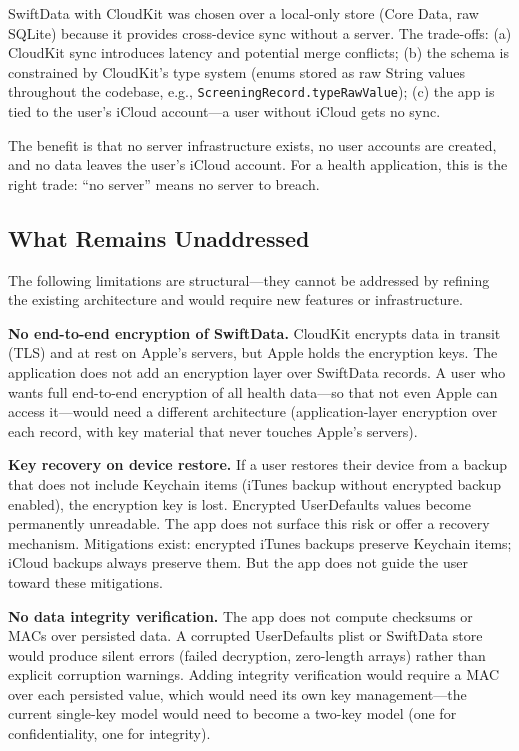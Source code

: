 \documentclass[11pt,a4paper]{article}
\newcommand{\code}[1]{\texttt{\small #1}}
\begin{document}
SwiftData with CloudKit was chosen over a local-only store (Core Data,
raw SQLite) because it provides cross-device sync without a server. The
trade-offs: (a) CloudKit sync introduces latency and potential merge
conflicts; (b) the schema is constrained by CloudKit's type system (enums
stored as raw String values throughout the codebase, e.g.,
\code{ScreeningRecord.typeRawValue}); (c) the app is tied to the user's
iCloud account---a user without iCloud gets no sync.

The benefit is that no server infrastructure exists, no user accounts are
created, and no data leaves the user's iCloud account. For a health
application, this is the right trade: ``no server'' means no server to
breach.

\subsection{What Remains Unaddressed}
\label{sec:unaddressed}

The following limitations are structural---they cannot be addressed by
refining the existing architecture and would require new features or
infrastructure.

\textbf{No end-to-end encryption of SwiftData.} CloudKit encrypts data in
transit (TLS) and at rest on Apple's servers, but Apple holds the encryption
keys. The application does not add an encryption layer over SwiftData
records. A user who wants full end-to-end encryption of all health data---so
that not even Apple can access it---would need a different architecture
(application-layer encryption over each record, with key material that never
touches Apple's servers).

\textbf{Key recovery on device restore.} If a user restores their device from
a backup that does not include Keychain items (iTunes backup without
encrypted backup enabled), the encryption key is lost. Encrypted UserDefaults
values become permanently unreadable. The app does not surface this risk or
offer a recovery mechanism. Mitigations exist: encrypted iTunes backups
preserve Keychain items; iCloud backups always preserve them. But the app
does not guide the user toward these mitigations.

\textbf{No data integrity verification.} The app does not compute checksums
or MACs over persisted data. A corrupted UserDefaults plist or SwiftData
store would produce silent errors (failed decryption, zero-length arrays)
rather than explicit corruption warnings. Adding integrity verification
would require a MAC over each persisted value, which would need its own key
management---the current single-key model would need to become a two-key
model (one for confidentiality, one for integrity).
\end{document}
